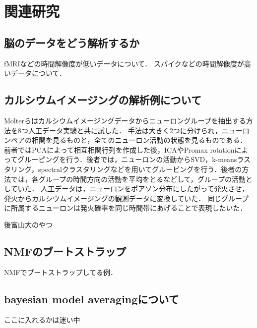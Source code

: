 \chapter{関連研究}
\section{脳のデータをどう解析するか}
fMRIなどの時間解像度が低いデータについて．
スパイクなどの時間解像度が高いデータについて．

\section{カルシウムイメージングの解析例について}
Molterらはカルシウムイメージングデータからニューロングループを抽出する方法を8つ人工データ実験と共に試した\cite{Molter2018}．
手法は大きく2つに分けられ，ニューロンペアの相関を見るものと，全てのニューロン活動の状態を見るものである．
前者ではPCAによって相互相関行列を作成した後，ICAやPromax rotationによってグルーピングを行う．後者では，ニューロンの活動からSVD，k-meansラスタリング，spectralクラスタリングなどを用いてグルーピングを行う．後者の方法では，各グループの時間方向の活動を平均をとるなどして，グループの活動としていた．
人工データは，ニューロンをポアソン分布にしたがって発火させ，発火からカルシウムイメージングの観測データに変換していた．
同じグループに所属するニューロンは発火確率を同じ時間帯にあげることで表現したいた．

後富山大のやつ

\section{NMFのブートストラップ}
NMFでブートストラップしてる例\cite{Ubaru2017}．

\section{bayesian model averagingについて}
ここに入れるかは迷い中
